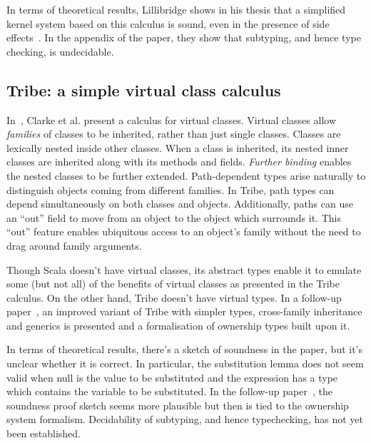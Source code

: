 \documentclass[10pt,journal,a4paper]{IEEEtran}
\begin{document}
In terms of theoretical results, Lillibridge shows in his thesis that
a simplified kernel system based on this calculus is sound, even in
the presence of side effects~\cite{lillibridge:thesis}. In the
appendix of the paper, they show that subtyping, and hence type
checking, is undecidable.

\subsection{Tribe: a simple virtual class calculus}

In~\cite{tribe}, Clarke et al. present a calculus for virtual
classes. Virtual classes allow {\it families} of classes to be
inherited, rather than just single classes. Classes are lexically
nested inside other classes. When a class is inherited, its nested
inner classes are inherited along with its methods and fields. {\it
  Further binding} enables the nested classes to be further
extended. Path-dependent types arise naturally to distinguish objects
coming from different families. In Tribe, path types can depend
simultaneously on both classes and objects. Additionally, paths can
use an ``out'' field to move from an object to the object which
surrounds it. This ``out'' feature enables ubiquitous access to an
object's family without the need to drag around family arguments.


Though Scala doesn't have virtual classes, its abstract types enable
it to emulate some (but not all) of the benefits of virtual classes as
presented in the Tribe calculus. On the other hand, Tribe doesn't have
virtual types. In a follow-up paper~\cite{tribalo}, an improved
variant of Tribe with simpler types, cross-family inheritance and
generics is presented and a formalisation of ownership types built
upon it.

In terms of theoretical results, there's a sketch of soundness in the
paper, but it's unclear whether it is correct. In particular, the
substitution lemma does not seem valid when null is the value to be
substituted and the expression has a type which contains the variable
to be substituted. In the follow-up paper~\cite{tribalo}, the
soundness proof sketch seems more plausible but then is tied to the
ownership system formalism. Decidability of subtyping, and hence
typechecking, has not yet been established.
\end{document}
